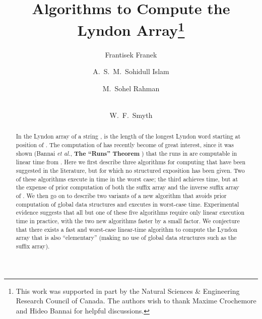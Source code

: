 \documentclass[10pt]{llncs}
\def\s#1{\mbox{\boldmath }}
\begin{document}
\pagestyle{headings}
\title{Algorithms to Compute the Lyndon Array\thanks
{This work was supported in part by the
Natural Sciences \& Engineering Research Council of Canada.
The authors wish to thank Maxime Crochemore and Hideo Bannai
for helpful discussions.}
}
\author{Frantisek Franek
\and
A.\ S.\ M.\ Sohidull Islam
\and M.\ Sohel Rahman
\and \\ 
W.\ F.\ Smyth
}

\maketitle

\begin{abstract}
In the Lyndon array  of a string ,
 is the length of the longest Lyndon word starting at
position  of \s{x}.
The computation of  has recently become of
great interest, since it was shown
(Bannai {\it et al.}, {\bf The ``Runs'' Theorem} \cite{BIINTT14})
that the runs in \s{x} are computable in linear time
from .
Here we first describe three algorithms for computing 
that have been suggested in the literature,
but for which no structured exposition has been given.
Two of these algorithms execute in  time in the worst case;
the third achieves  time,
but at the expense of prior computation of both the suffix array
and the inverse suffix array of \s{x}.
We then go on to describe two variants of a new algorithm that
avoids prior computation of global data structures
and executes in worst-case  time.
Experimental evidence suggests that all but one of these five
algorithms require only linear execution time in practice,
with the two new algorithms faster by a small factor.
We conjecture that there exists a fast
and worst-case linear-time algorithm to compute the Lyndon array
that is also ``elementary''
(making no use of global data structures such as the suffix array).
\end{abstract}
\end{document}
